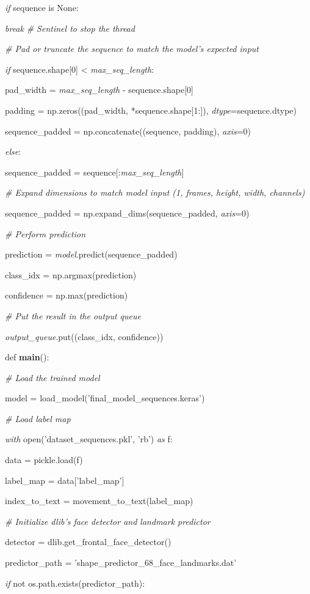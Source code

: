 \documentclass[
]{article}
\begin{document}
\emph{if} sequence is None:

\emph{break} \emph{\# Sentinel to stop the thread}

\emph{\# Pad or truncate the sequence to match the model's expected input}

\emph{if} sequence.shape{[}0{]} \textless{} \emph{max\_seq\_length}:

pad\_width = \emph{max\_seq\_length} - sequence.shape{[}0{]}

padding = np.zeros((pad\_width, *sequence.shape{[}1:{]}), \emph{dtype}=sequence.dtype)

sequence\_padded = np.concatenate((sequence, padding), \emph{axis}=0)

\emph{else}:

sequence\_padded = sequence{[}:\emph{max\_seq\_length}{]}

\emph{\# Expand dimensions to match model input (1, frames, height, width, channels)}

sequence\_padded = np.expand\_dims(sequence\_padded, \emph{axis}=0)

\emph{\# Perform prediction}

prediction = \emph{model}.predict(sequence\_padded)

class\_idx = np.argmax(prediction)

confidence = np.max(prediction)

\emph{\# Put the result in the output queue}

\emph{output\_queue}.put((class\_idx, confidence))

def \textbf{main}():

\emph{\# Load the trained model}

model = load\_model('final\_model\_sequences.keras')

\emph{\# Load label map}

\emph{with} open('dataset\_sequences.pkl', 'rb') \emph{as} f:

data = pickle.load(f)

label\_map = data{[}'label\_map'{]}

index\_to\_text = movement\_to\_text(label\_map)

\emph{\# Initialize dlib's face detector and landmark predictor}

detector = dlib.get\_frontal\_face\_detector()

predictor\_path = 'shape\_predictor\_68\_face\_landmarks.dat'

\emph{if} not os.path.exists(predictor\_path):
\end{document}

